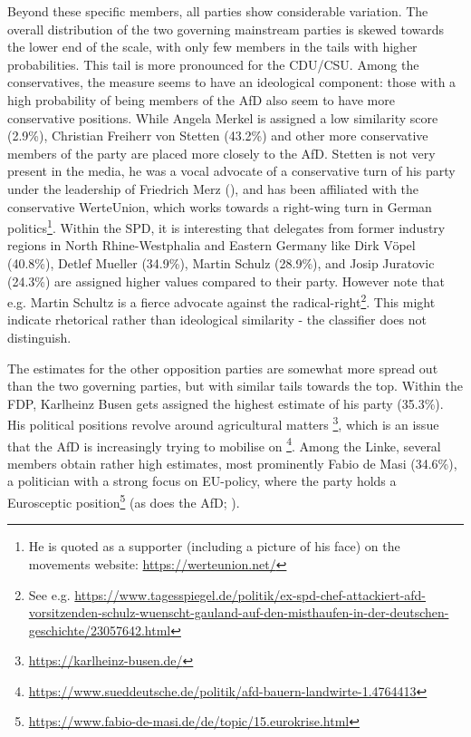 \documentclass{article}
\begin{document}
Beyond these specific members, all parties show considerable variation. The overall distribution of the two governing mainstream parties is skewed towards the lower end of the scale, with only few members in the tails with higher probabilities. This tail is more pronounced for the CDU/CSU. Among the conservatives, the measure seems to have an ideological component: those with a high probability of being members of the AfD also seem to have more conservative positions. While Angela Merkel is assigned a low similarity score (2.9\%), Christian Freiherr von Stetten (43.2\%) and other more conservative members of the party are placed more closely to the AfD. Stetten is not very present in the media, he was a vocal advocate of a conservative turn of his party under the leadership of Friedrich Merz (\cite{Weinzierler2019}), and has been affiliated with the conservative WerteUnion, which works towards a right-wing turn in German politics\footnote{He is quoted as a supporter (including a picture of his face) on the movements website: \url{https://werteunion.net/}}. Within the SPD, it is interesting that delegates from former industry regions in North Rhine-Westphalia and Eastern Germany like Dirk Vöpel (40.8\%), Detlef Mueller (34.9\%), Martin Schulz (28.9\%), and Josip Juratovic (24.3\%) are assigned higher values compared to their party. However note that e.g. Martin Schultz is a fierce advocate against the radical-right\footnote{See e.g. \href{https://www.tagesspiegel.de/politik/ex-spd-chef-attackiert-afd-vorsitzenden-schulz-wuenscht-gauland-auf-den-misthaufen-in-der-deutschen-geschichte/23057642.html}{https://www.tagesspiegel.de/politik/ex-spd-chef-attackiert-afd-vorsitzenden-schulz-wuenscht-gauland-auf-den-misthaufen-in-der-deutschen-geschichte/23057642.html}}. This might indicate rhetorical rather than ideological similarity - the classifier does not distinguish.\par

The estimates for the other opposition parties are somewhat more spread out than the two governing parties, but with similar tails towards the top. Within the FDP, Karlheinz Busen gets assigned the highest estimate of his party (35.3\%). His political positions revolve around agricultural matters \footnote{\url{https://karlheinz-busen.de/}}, which is an issue that the AfD is increasingly trying to mobilise on \footnote{\url{https://www.sueddeutsche.de/politik/afd-bauern-landwirte-1.4764413}}.  Among the Linke, several members obtain rather high estimates, most prominently Fabio de Masi (34.6\%), a politician with a strong focus on EU-policy, where the party holds a Eurosceptic position\footnote{\url{https://www.fabio-de-masi.de/de/topic/15.eurokrise.html}} (as does the AfD; \cite{ThePopulist2019}).\par
\end{document}

